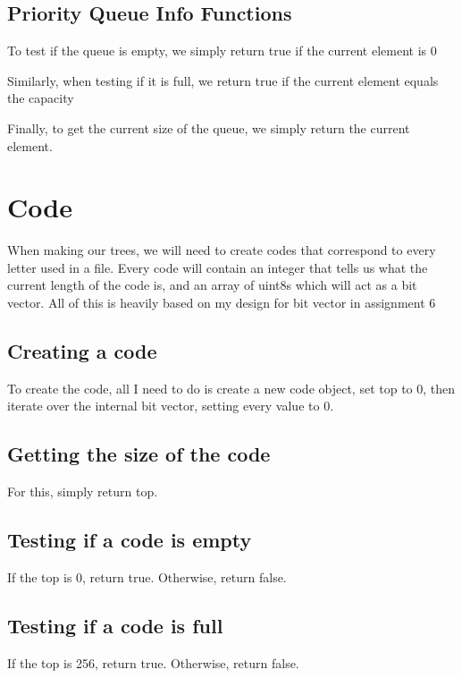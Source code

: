 \documentclass[11pt]{article}
\begin{document}
\subsection{Priority Queue Info Functions}

To test if the queue is empty, we simply return true if the current element is 0

Similarly, when testing if it is full, we return true if the current element equals the capacity

Finally, to get the current size of the queue, we simply return the current element.

\section{Code}

When making our trees, we will need to create codes that correspond to every letter used in a file. Every code will contain an integer that tells us what the current length of the code is, and an array of uint8s which will act as a bit vector. All of this is heavily based on my design for bit vector in assignment 6

\subsection{Creating a code}

To create the code, all I need to do is create a new code object, set top to 0, then iterate over the internal bit vector, setting every value to 0.

\subsection{Getting the size of the code}

For this, simply return top.

\subsection{Testing if a code is empty}

If the top is 0, return true. Otherwise, return false.

\subsection{Testing if a code is full}

If the top is 256, return true. Otherwise, return false.
\end{document}
